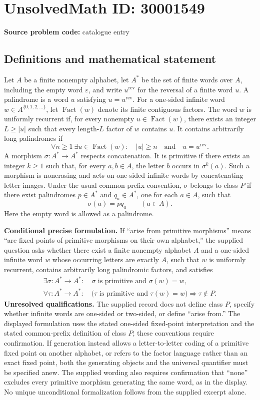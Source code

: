 \documentclass[11pt]{article}
\begin{document}
\section*{UnsolvedMath ID: 30001549}
\textbf{Source problem code:} catalogue entry
\subsection{Definitions and mathematical statement}
Let \(A\) be a finite nonempty alphabet, let \(A^*\) be the set of finite words over \(A\), including the empty word \(\varepsilon\), and write \(u^{\mathrm{rev}}\) for the reversal of a finite word \(u\). A palindrome is a word \(u\) satisfying \(u=u^{\mathrm{rev}}\). For a one-sided infinite word \(w\in A^{\{0,1,2,\ldots\}}\), let \(\operatorname{Fact}(w)\) denote its finite contiguous factors. The word \(w\) is uniformly recurrent if, for every nonempty \(u\in\operatorname{Fact}(w)\), there exists an integer \(L\geq |u|\) such that every length-\(L\) factor of \(w\) contains \(u\). It contains arbitrarily long palindromes if
\[
\forall n\geq 1\ \exists u\in\operatorname{Fact}(w):\quad |u|\geq n\quad\text{and}\quad u=u^{\mathrm{rev}}.
\]
A morphism \(\sigma:A^*\to A^*\) respects concatenation. It is primitive if there exists an integer \(k\geq1\) such that, for every \(a,b\in A\), the letter \(b\) occurs in \(\sigma^k(a)\). Such a morphism is nonerasing and acts on one-sided infinite words by concatenating letter images. Under the usual common-prefix convention, \(\sigma\) belongs to class \(P\) if there exist palindromes \(p\in A^*\) and \(q_a\in A^*\), one for each \(a\in A\), such that
\[
\sigma(a)=p q_a\qquad(a\in A).
\]
Here the empty word is allowed as a palindrome.

\textbf{Conditional precise formulation.} If ``arise from primitive morphisms'' means ``are fixed points of primitive morphisms on their own alphabet,'' the supplied question asks whether there exist a finite nonempty alphabet \(A\) and a one-sided infinite word \(w\) whose occurring letters are exactly \(A\), such that \(w\) is uniformly recurrent, contains arbitrarily long palindromic factors, and satisfies
\[
\begin{gathered}
\exists\sigma:A^*\to A^*:\quad \sigma\text{ is primitive and }\sigma(w)=w,\\
\forall\tau:A^*\to A^*:\quad
\bigl(\tau\text{ is primitive and }\tau(w)=w\bigr)
\Longrightarrow \tau\notin P.
\end{gathered}
\]
\textbf{Unresolved qualifications.} The supplied record does not define class \(P\), specify whether infinite words are one-sided or two-sided, or define ``arise from.'' The displayed formulation uses the stated one-sided fixed-point interpretation and the stated common-prefix definition of class \(P\); these conventions require confirmation. If generation instead allows a letter-to-letter coding of a primitive fixed point on another alphabet, or refers to the factor language rather than an exact fixed point, both the generating objects and the universal quantifier must be specified anew. The supplied wording also requires confirmation that ``none'' excludes every primitive morphism generating the same word, as in the display. No unique unconditional formalization follows from the supplied excerpt alone.
\end{document}
